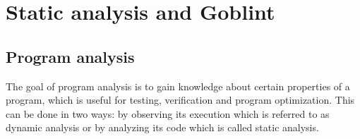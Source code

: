 


\chapter{Static analysis and Goblint}
\section{Program analysis}
The goal of program analysis is to gain knowledge about certain properties of a program, which is useful for testing, verification and program optimization.
This can be done in two ways: by observing its execution which is referred to as dynamic analysis or by analyzing its code which is called static analysis.

